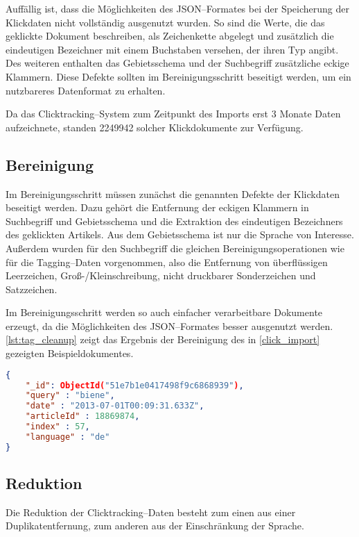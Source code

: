 Auffällig ist, dass die Möglichkeiten des JSON--Formates bei der Speicherung der Klickdaten nicht vollständig ausgenutzt wurden. So sind die Werte, die das geklickte Dokument beschreiben, als Zeichenkette abgelegt und zusätzlich die eindeutigen Bezeichner mit einem Buchstaben versehen, der ihren Typ angibt. Des weiteren enthalten  das Gebietsschema und der Suchbegriff zusätzliche eckige Klammern. Diese Defekte sollten im Bereinigungsschritt beseitigt werden, um ein nutzbareres Datenformat zu erhalten.

Da das Clicktracking--System zum Zeitpunkt des Imports erst 3 Monate Daten aufzeichnete, standen \num{2249942} solcher Klickdokumente zur Verfügung.

\subsection{Bereinigung}

Im Bereinigungsschritt müssen zunächst die genannten Defekte der Klickdaten beseitigt werden. Dazu gehört die Entfernung der eckigen Klammern in Suchbegriff und Gebietsschema und die Extraktion des eindeutigen Bezeichners des geklickten Artikels. Aus dem Gebietsschema ist nur die Sprache von Interesse. Außerdem wurden für den Suchbegriff die gleichen Bereinigungsoperationen wie für die Tagging--Daten vorgenommen, also die Entfernung von überflüssigen Leerzeichen, Groß-/Kleinschreibung, nicht druckbarer Sonderzeichen und Satzzeichen.

Im Bereinigungsschritt werden so auch einfacher verarbeitbare Dokumente erzeugt, da die Möglichkeiten des JSON--Formates besser ausgenutzt werden. \cref{lst:tag_cleanup} zeigt das Ergebnis der Bereinigung des in \cref{click_import} gezeigten Beispieldokumentes.

\begin{lstlisting}[language=json, label={lst:tag_cleanup}, caption={Bereinigtes Clicktracking--Dokument}]
{
    "_id": ObjectId("51e7b1e0417498f9c6868939"),
    "query" : "biene",
    "date" : "2013-07-01T00:09:31.633Z",
    "articleId" : 18869874,
    "index" : 57,
    "language" : "de"
}
\end{lstlisting}

\subsection{Reduktion}

Die Reduktion der Clicktracking--Daten besteht zum einen aus einer Duplikatentfernung, zum anderen aus der Einschränkung der Sprache.

